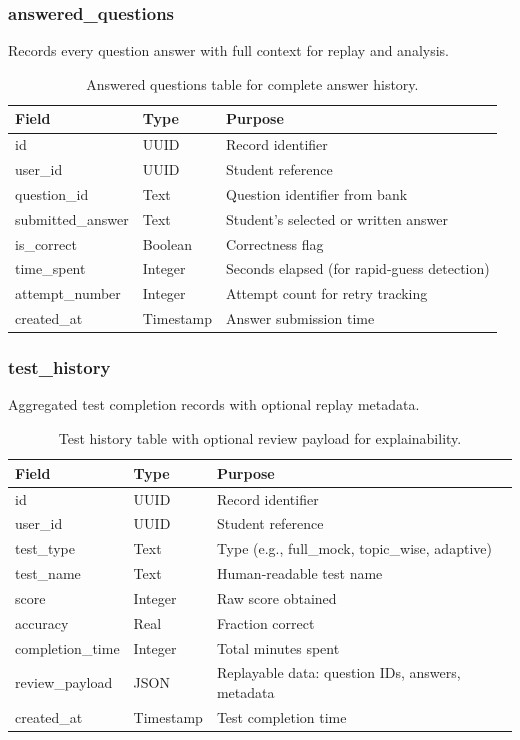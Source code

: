 \documentclass[sigconf,authordraft,twoside]{acmart}
\begin{document}
\subsubsection{answered\_questions}
Records every question answer with full context for replay and analysis.

\begin{table}[t]
\centering
\small
\begin{tabularx}{\columnwidth}{>{\raggedright\arraybackslash}p{} >{\raggedright\arraybackslash}p{} X}
\toprule
\textbf{Field} & \textbf{Type} & \textbf{Purpose} \\
\midrule
id & UUID & Record identifier \\
user\_id & UUID & Student reference \\
question\_id & Text & Question identifier from bank \\
submitted\_answer & Text & Student's selected or written answer \\
is\_correct & Boolean & Correctness flag \\
time\_spent & Integer & Seconds elapsed (for rapid-guess detection) \\
attempt\_number & Integer & Attempt count for retry tracking \\
created\_at & Timestamp & Answer submission time \\
\bottomrule
\end{tabularx}
\caption{Answered questions table for complete answer history.}
\end{table}

\subsubsection{test\_history}
Aggregated test completion records with optional replay metadata.

\begin{table}[t]
\centering
\small
\begin{tabularx}{\columnwidth}{>{\raggedright\arraybackslash}p{} >{\raggedright\arraybackslash}p{} X}
\toprule
\textbf{Field} & \textbf{Type} & \textbf{Purpose} \\
\midrule
id & UUID & Record identifier \\
user\_id & UUID & Student reference \\
test\_type & Text & Type (e.g., full\_mock, topic\_wise, adaptive) \\
test\_name & Text & Human-readable test name \\
score & Integer & Raw score obtained \\
accuracy & Real & Fraction correct \\
completion\_time & Integer & Total minutes spent \\
review\_payload & JSON & Replayable data: question IDs, answers, metadata \\
created\_at & Timestamp & Test completion time \\
\bottomrule
\end{tabularx}
\caption{Test history table with optional review payload for explainability.}
\end{table}
\end{document}
